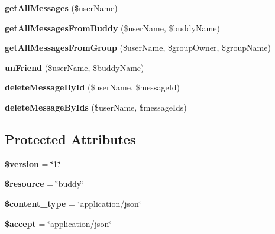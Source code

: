 \begin{DoxyCompactItemize}
\item 
\hypertarget{class_buddy_service_ac9ee21b863796b9de9fa3668b4115554}{{\bfseries get\+All\+Messages} (\$user\+Name)}\label{class_buddy_service_ac9ee21b863796b9de9fa3668b4115554}

\item 
\hypertarget{class_buddy_service_acc23b4d80071a1426b9ff4160ed374af}{{\bfseries get\+All\+Messages\+From\+Buddy} (\$user\+Name, \$buddy\+Name)}\label{class_buddy_service_acc23b4d80071a1426b9ff4160ed374af}

\item 
\hypertarget{class_buddy_service_abe4829eb0dbc555ea6f74f70ea1691de}{{\bfseries get\+All\+Messages\+From\+Group} (\$user\+Name, \$group\+Owner, \$group\+Name)}\label{class_buddy_service_abe4829eb0dbc555ea6f74f70ea1691de}

\item 
\hypertarget{class_buddy_service_acf6a83601af2ad4c63c120661dc907bd}{{\bfseries un\+Friend} (\$user\+Name, \$buddy\+Name)}\label{class_buddy_service_acf6a83601af2ad4c63c120661dc907bd}

\item 
\hypertarget{class_buddy_service_a88ed1f8c762a071c71b574a0d50e4639}{{\bfseries delete\+Message\+By\+Id} (\$user\+Name, \$message\+Id)}\label{class_buddy_service_a88ed1f8c762a071c71b574a0d50e4639}

\item 
\hypertarget{class_buddy_service_a2f1bf2bf924507acb03240fe962dd492}{{\bfseries delete\+Message\+By\+Ids} (\$user\+Name, \$message\+Ids)}\label{class_buddy_service_a2f1bf2bf924507acb03240fe962dd492}

\end{DoxyCompactItemize}
\subsection*{Protected Attributes}
\begin{DoxyCompactItemize}
\item 
\hypertarget{class_buddy_service_a17c8948c68aa44fa9961ae169b6a8961}{{\bfseries \$version} = \char`\"{}1.\char`\"{}}\label{class_buddy_service_a17c8948c68aa44fa9961ae169b6a8961}

\item 
\hypertarget{class_buddy_service_abd4c7b8b084214b8d2533ba07fce6b83}{{\bfseries \$resource} = \char`\"{}buddy\char`\"{}}\label{class_buddy_service_abd4c7b8b084214b8d2533ba07fce6b83}

\item 
\hypertarget{class_buddy_service_ae754d6373f275e781f47c8bc9b994b6d}{{\bfseries \$content\+\_\+type} = \char`\"{}application/json\char`\"{}}\label{class_buddy_service_ae754d6373f275e781f47c8bc9b994b6d}

\item 
\hypertarget{class_buddy_service_a75fc18c4ff06288ff9fdf8aba9bd1081}{{\bfseries \$accept} = \char`\"{}application/json\char`\"{}}\label{class_buddy_service_a75fc18c4ff06288ff9fdf8aba9bd1081}

\end{DoxyCompactItemize}
